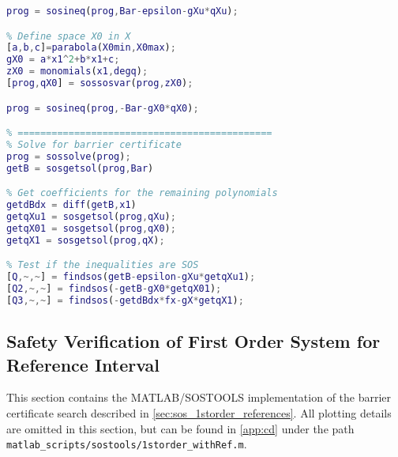 \begin{lstlisting}[language=matlab]
prog = sosineq(prog,Bar-epsilon-gXu*qXu);

% Define space X0 in X
[a,b,c]=parabola(X0min,X0max);
gX0 = a*x1^2+b*x1+c;
zX0 = monomials(x1,degq);
[prog,qX0] = sossosvar(prog,zX0);

prog = sosineq(prog,-Bar-gX0*qX0);

% =============================================
% Solve for barrier certificate
prog = sossolve(prog);
getB = sosgetsol(prog,Bar)

% Get coefficients for the remaining polynomials
getdBdx = diff(getB,x1)
getqXu1 = sosgetsol(prog,qXu);
getqX01 = sosgetsol(prog,qX0);
getqX1 = sosgetsol(prog,qX);

% Test if the inequalities are SOS
[Q,~,~] = findsos(getB-epsilon-gXu*getqXu1);
[Q2,~,~] = findsos(-getB-gX0*getqX01);
[Q3,~,~] = findsos(-getdBdx*fx-gX*getqX1);
\end{lstlisting}

\subsection{Safety Verification of First Order System for Reference Interval}\label{app:sos_refinterval}
This section contains the MATLAB/SOSTOOLS implementation of the barrier certificate search described in \autoref{sec:sos_1storder_references}. All plotting details are omitted in this section, but can be found in \autoref{app:cd} under the path \texttt{matlab\_scripts/sostools/1storder\_withRef.m}.

